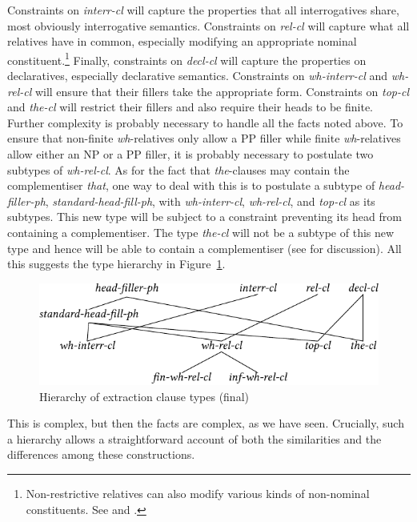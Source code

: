 \documentclass[output=paper
,notxmath 
	        ,collection
	        ,collectionchapter
 	        ,biblatex
                ,babelshorthands
                ,newtxmath
                ,draftmode
                ,colorlinks, citecolor=brown
]{langscibook}
\begin{document}
\noindent
Constraints on \emph{interr-cl} will capture the properties that all
interrogatives share, most obviously interrogative semantics.
Constraints on \emph{rel-cl} will capture what all relatives have in
common, especially modifying an appropriate nominal
constituent.\footnote{Non-restrictive relatives can also modify various
  kinds of non-nominal constituents. See \citet{Arnold:04} and
  \citet{Arnold:Borsley:08}.%
} Finally, constraints on \emph{decl-cl}
will capture the properties on declaratives, especially declarative
semantics.  Constraints on \emph{wh-interr-cl} and \emph{wh-rel-cl}
will ensure that their fillers take the appropriate form. Constraints
on \emph{top-cl} and \emph{the-cl} will restrict their fillers and
also require their heads to be finite. Further complexity is probably
necessary to handle all the facts noted above. To ensure that
non-finite \emph{wh}-relatives only allow a PP filler while finite
\emph{wh}-relatives allow either an NP or a PP filler, it is probably
necessary to postulate two subtypes of \emph{wh-rel-cl}. As for the
fact that \emph{the}-clauses may contain the complementiser
\emph{that}, one way to deal with this is to postulate a subtype of
\emph{head-filler-ph}, \emph{standard-head-fill-ph}, with
\emph{wh-interr-cl}, \emph{wh-rel-cl}, and \emph{top-cl} as its
subtypes. This new type will be subject to a constraint preventing its
head from containing a complementiser. The type \emph{the-cl} will not
be a subtype of this new type and hence will be able to contain a
complementiser (see \citealt[13--15]{Borsley:11} for discussion). All this suggests
the type hierarchy in Figure~\ref{fig:UDC:50}. 
%
\begin{figure}
  \centering
  \includegraphics{figures/BB-extraction-function-hier-full-crop}
  \caption{\label{fig:UDC:50}Hierarchy of extraction clause types (final)}
  
\end{figure}
%
%
This is complex, but then the facts are complex, as we have seen.
Crucially, such a hierarchy allows a straightforward account of both the
similarities and the differences among these constructions.
\end{document}
